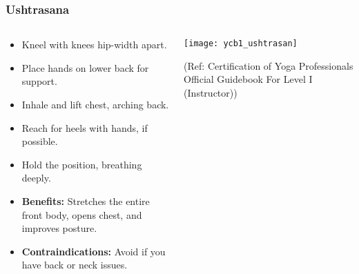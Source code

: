 \begin{frame}[fragile]\frametitle{Ushtrasana}
\begin{columns}
    \begin{column}[T]{0.5\linewidth}
      \begin{itemize}
        \item Kneel with knees hip-width apart.
        \item Place hands on lower back for support.
        \item Inhale and lift chest, arching back.
        \item Reach for heels with hands, if possible.
        \item Hold the position, breathing deeply.
        \item \textbf{Benefits:} Stretches the entire front body, opens chest, and improves posture.
        \item \textbf{Contraindications:} Avoid if you have back or neck issues.
      \end{itemize}
    \end{column}
    \begin{column}[T]{0.5\linewidth}
        \begin{center}
        \begin{center}
		        \texttt{[image: ycb1\_ushtrasan]}
				
				{\tiny (Ref: Certification  of Yoga Professionals Official Guidebook For Level I (Instructor))}	        
		\end{center}   
        \end{center}    
    \end{column}
  \end{columns}
\end{frame}

